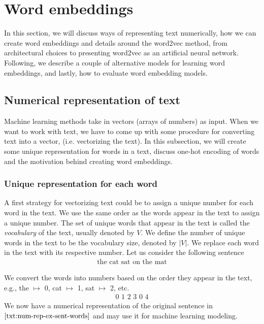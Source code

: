 \section{Word embeddings}
In this section, we will discuss ways of representing text numerically, how we can create word embeddings and details around the word2vec method, from architectural choices to presenting word2vec as an artificial neural network. Following, we describe a couple of alternative models for learning word embeddings, and lastly, how to evaluate word embedding models.

\subsection{Numerical representation of text}
Machine learning methods take in vectors (arrays of numbers) as input. When we want to work with text, we have to come up with some procedure for converting text into a vector, (i.e. vectorizing the text).
In this subsection, we will create some unique representation for words in a text, discuss one-hot encoding of words and the motivation behind creating word embeddings.

\subsubsection{Unique representation for each word}
\label{unique-representation-for-each-word}
A first strategy for vectorizing text could be to assign a unique number for each word in the text. We use the same order as the words appear in the text to assign a unique number. The set of unique words that appear in the text is called the \textit{vocabulary} of the text, usually denoted by $V$. We define the number of unique words in the text to be the vocabulary size, denoted by $|V|$. We replace each word in the text with its respective number. Let us consider the following sentence
\begin{align}
    \text{the cat sat on the mat} \label{txt:num-rep-ex-sent-words}
\end{align}

We convert the words into numbers based on the order they appear in the text, e.g., the $\mapsto$ 0, cat $\mapsto$ 1, sat $\mapsto$ 2, etc.
\begin{align}
    \text{0 1 2 3 0 4} \label{txt:num-rep-ex-sent}
\end{align}
We now have a numerical representation of the original sentence in $\cref{txt:num-rep-ex-sent-words}$ and may use it for machine learning modeling.

